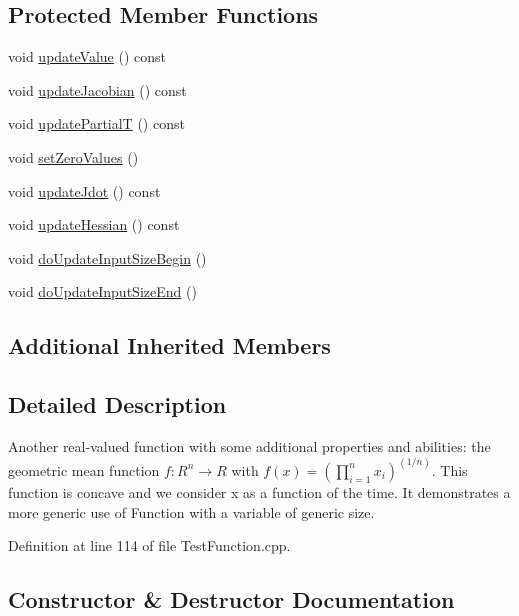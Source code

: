 \subsection*{Protected Member Functions}
\begin{DoxyCompactItemize}
\item 
void \hyperlink{classFunction2_ae491a20ff42d37d6512bc5b45b1a2566}{update\+Value} () const
\item 
void \hyperlink{classFunction2_aed704dcbe5332636a56a49d91f40d65f}{update\+Jacobian} () const
\item 
void \hyperlink{classFunction2_ac5152db91aedd2eddb4b69e6bd446659}{update\+PartialT} () const
\item 
void \hyperlink{classFunction2_ad1ba3ed750cfec23435dcd9f37c10eec}{set\+Zero\+Values} ()
\item 
void \hyperlink{classFunction2_a134ead37ced770c93bbce1ef656564bb}{update\+Jdot} () const
\item 
void \hyperlink{classFunction2_a79440b2c9d2e8f80abe1d35352f49a1c}{update\+Hessian} () const
\item 
void \hyperlink{classFunction2_ab05887e9f8995782cdc3f9399c476c4e}{do\+Update\+Input\+Size\+Begin} ()
\item 
void \hyperlink{classFunction2_a6a875214e7fa8b07f064cd699ac29ff6}{do\+Update\+Input\+Size\+End} ()
\end{DoxyCompactItemize}
\subsection*{Additional Inherited Members}


\subsection{Detailed Description}
Another real-\/valued function with some additional properties and abilities\+: the geometric mean function $ f: R^n \rightarrow R $ with $ f(x) = \left(\prod_{i=1}^n x_i\right)^(1/n) $. This function is concave and we consider x as a function of the time. It demonstrates a more generic use of Function with a variable of generic size. 

Definition at line 114 of file Test\+Function.\+cpp.



\subsection{Constructor \& Destructor Documentation}
\hypertarget{classFunction2_ad907d2408853a2d278f87293abfcdf47}{}\label{classFunction2_ad907d2408853a2d278f87293abfcdf47} 
